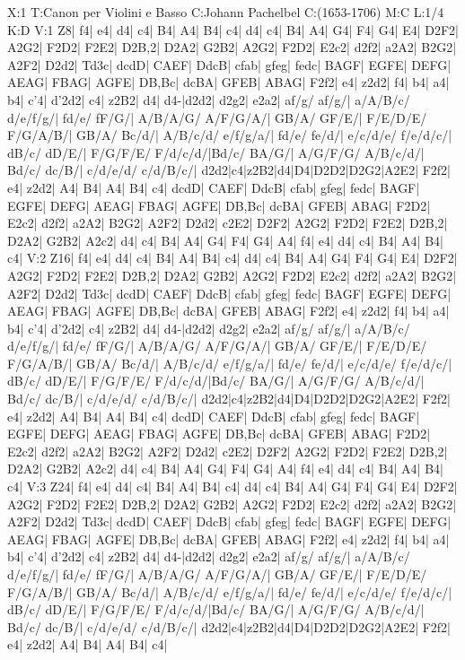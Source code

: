 X:1
T:Canon per Violini e Basso
C:Johann Pachelbel
C:(1653-1706)
M:C
L:1/4
K:D
V:1
Z8|
f4| e4| d4| c4| B4| A4| B4| c4|
d4| c4| B4| A4| G4| F4| G4| E4|
D2F2| A2G2| F2D2| F2E2| D2B,2| D2A2| G2B2| A2G2|
F2D2| E2c2| d2f2| a2A2| B2G2| A2F2| D2d2| Td3c|
dcdD| CAEF| DdcB| cfab| gfeg| fedc| BAGF| EGFE|
DEFG| AEAG| FBAG| AGFE| DB,Bc| dcBA| GFEB| ABAG|
F2f2| e4| z2d2| f4| b4| a4| b4| c'4|
d'2d2| c4| z2B2| d4| d4-|d2d2| d2g2| e2a2|
af/g/ af/g/| a/A/B/c/ d/e/f/g/| fd/e/ fF/G/| A/B/A/G/ A/F/G/A/| GB/A/ GF/E/| F/E/D/E/ F/G/A/B/| GB/A/ Bc/d/| A/B/c/d/ e/f/g/a/|
fd/e/ fe/d/| e/c/d/e/ f/e/d/c/| dB/c/ dD/E/| F/G/F/E/ F/d/c/d/|Bd/c/ BA/G/| A/G/F/G/ A/B/c/d/| Bd/c/ dc/B/| c/d/e/d/ c/d/B/c/|
d2d2|c4|z2B2|d4|D4|D2D2|D2G2|A2E2|
F2f2| e4| z2d2| A4| B4| A4| B4| c4|
dcdD| CAEF| DdcB| cfab| gfeg| fedc| BAGF| EGFE|
DEFG| AEAG| FBAG| AGFE| DB,Bc| dcBA| GFEB| ABAG|
F2D2| E2c2| d2f2| a2A2| B2G2| A2F2| D2d2| c2E2|
D2F2| A2G2| F2D2| F2E2| D2B,2| D2A2| G2B2| A2c2|
d4| c4| B4| A4| G4| F4| G4| A4|
f4| e4| d4| c4| B4| A4| B4| c4|
V:2
Z16|
f4| e4| d4| c4| B4| A4| B4| c4|
d4| c4| B4| A4| G4| F4| G4| E4|
D2F2| A2G2| F2D2| F2E2| D2B,2| D2A2| G2B2| A2G2|
F2D2| E2c2| d2f2| a2A2| B2G2| A2F2| D2d2| Td3c|
dcdD| CAEF| DdcB| cfab| gfeg| fedc| BAGF| EGFE|
DEFG| AEAG| FBAG| AGFE| DB,Bc| dcBA| GFEB| ABAG|
F2f2| e4| z2d2| f4| b4| a4| b4| c'4|
d'2d2| c4| z2B2| d4| d4-|d2d2| d2g2| e2a2|
af/g/ af/g/| a/A/B/c/ d/e/f/g/| fd/e/ fF/G/| A/B/A/G/ A/F/G/A/| GB/A/ GF/E/| F/E/D/E/ F/G/A/B/| GB/A/ Bc/d/| A/B/c/d/ e/f/g/a/|
fd/e/ fe/d/| e/c/d/e/ f/e/d/c/| dB/c/ dD/E/| F/G/F/E/ F/d/c/d/|Bd/c/ BA/G/| A/G/F/G/ A/B/c/d/| Bd/c/ dc/B/| c/d/e/d/ c/d/B/c/|
d2d2|c4|z2B2|d4|D4|D2D2|D2G2|A2E2|
F2f2| e4| z2d2| A4| B4| A4| B4| c4|
dcdD| CAEF| DdcB| cfab| gfeg| fedc| BAGF| EGFE|
DEFG| AEAG| FBAG| AGFE| DB,Bc| dcBA| GFEB| ABAG|
F2D2| E2c2| d2f2| a2A2| B2G2| A2F2| D2d2| c2E2|
D2F2| A2G2| F2D2| F2E2| D2B,2| D2A2| G2B2| A2c2|
d4| c4| B4| A4| G4| F4| G4| A4|
f4| e4| d4| c4| B4| A4| B4| c4|
V:3
Z24|
f4| e4| d4| c4| B4| A4| B4| c4|
d4| c4| B4| A4| G4| F4| G4| E4|
D2F2| A2G2| F2D2| F2E2| D2B,2| D2A2| G2B2| A2G2|
F2D2| E2c2| d2f2| a2A2| B2G2| A2F2| D2d2| Td3c|
dcdD| CAEF| DdcB| cfab| gfeg| fedc| BAGF| EGFE|
DEFG| AEAG| FBAG| AGFE| DB,Bc| dcBA| GFEB| ABAG|
F2f2| e4| z2d2| f4| b4| a4| b4| c'4|
d'2d2| c4| z2B2| d4| d4-|d2d2| d2g2| e2a2|
af/g/ af/g/| a/A/B/c/ d/e/f/g/| fd/e/ fF/G/| A/B/A/G/ A/F/G/A/| GB/A/ GF/E/| F/E/D/E/ F/G/A/B/| GB/A/ Bc/d/| A/B/c/d/ e/f/g/a/|
fd/e/ fe/d/| e/c/d/e/ f/e/d/c/| dB/c/ dD/E/| F/G/F/E/ F/d/c/d/|Bd/c/ BA/G/| A/G/F/G/ A/B/c/d/| Bd/c/ dc/B/| c/d/e/d/ c/d/B/c/|
d2d2|c4|z2B2|d4|D4|D2D2|D2G2|A2E2|
F2f2| e4| z2d2| A4| B4| A4| B4| c4|
